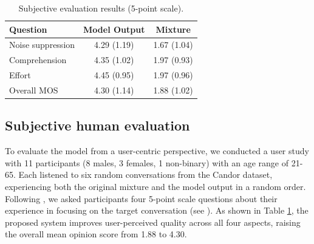{\begin{table}[t!]
\caption{Subjective evaluation results (5-point scale).}
\vskip -0.1in
\centering
  \setlength{\tabcolsep}{6pt} %
{\footnotesize
\begin{tabular}{lcc}
\toprule
\textbf{Question} & \textbf{Model Output} & \textbf{Mixture} \\
\midrule
Noise suppression          & 4.29 (1.19) & 1.67 (1.04) \\
Comprehension & 4.35 (1.02) & 1.97 (0.93) \\
Effort                     & 4.45 (0.95) & 1.97 (0.96) \\
Overall MOS                & 4.30 (1.14) & 1.88 (1.02) \\
\bottomrule
\end{tabular}
}
\label{tab:user_study_table}
\vskip -0.15in
\end{table}

\subsection{Subjective human evaluation}

{To evaluate the model from a user-centric perspective, we conducted a user study with 11 participants (8 males, 3 females, 1 non-binary) with an age range of 21-65. Each listened to six random conversations from the Candor dataset, experiencing both the original mixture and the model output in a random order. Following \cite{10.1145/3613904.3642057}, we asked participants four 5-point scale questions about their experience in focusing on the target conversation (see ). As shown in Table \ref{tab:user_study_table}, the proposed system improves user-perceived quality across all four aspects, raising the overall mean opinion score from 1.88 to 4.30.}


}
